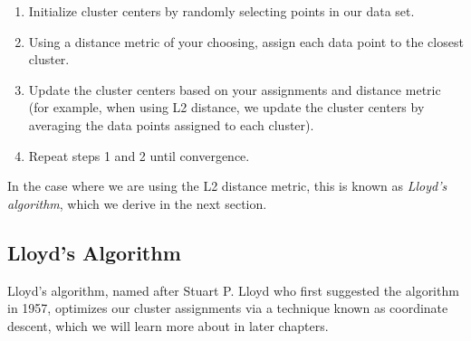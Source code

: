 \begin{enumerate}
    \item Initialize cluster centers by randomly selecting points in our data set.
    \item Using a distance metric of your choosing, assign each data point to the closest cluster.
    \item Update the cluster centers based on your assignments and distance metric (for example, when using L2 distance, we update the cluster centers by averaging the data points assigned to each cluster).
    \item Repeat steps 1 and 2 until convergence.
\end{enumerate}

In the case where we are using the L2 distance metric, this is known as \textit{Lloyd's algorithm}, which we derive in the next section.

\subsection{Lloyd's Algorithm}
Lloyd's algorithm, named after Stuart P. Lloyd who first suggested the algorithm in 1957, optimizes our cluster assignments via a technique known as coordinate descent, which we will learn more about in later chapters.

